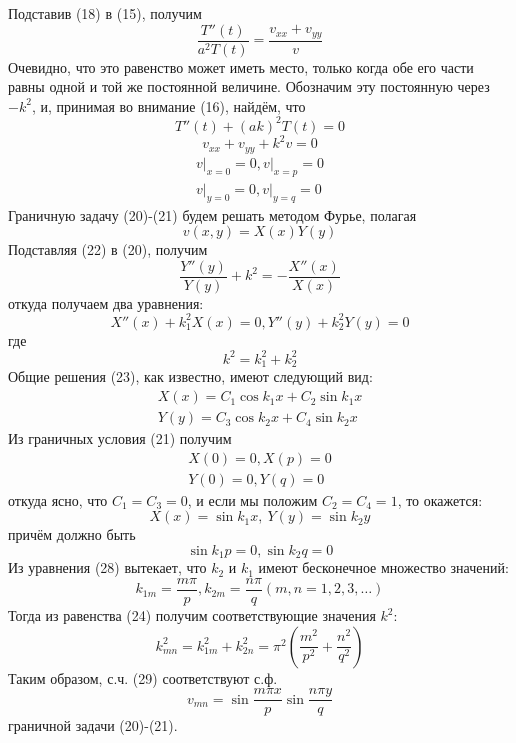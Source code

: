 \begin{enumerate}
Подставив (18) в (15), получим
\[
	\frac{T''(t)}{a^2 T(t)} = \frac{v_{xx} + v_{yy}}{v}
\]
Очевидно, что это равенство может иметь место, только когда обе его части равны одной и той же постоянной величине. Обозначим эту постоянную через $-k^2$, и, принимая во внимание (16), найдём, что
\[
	T''(t) + (ak)^2 T(t) = 0 \tag{19}
\]
\[
	v_{xx} + v_{yy} + k^2 v = 0 \tag{20}
\]
\[
	\begin{aligned}
	\left. v\right|_{x=0} = 0, \left. v\right|_{x=p} = 0 \\
			\left. v\right|_{y=0} = 0, \left. v\right|_{y=q} = 0
				\end{aligned} \tag{21}
\]
Граничную задачу (20)-(21) будем решать методом Фурье, полагая
\[
	v(x,y) = X(x) Y(y) \tag{22}
\]
Подставляя (22) в (20), получим
\[
	\frac{Y''(y)}{Y(y)} + k^2 = -\frac{X''(x)}{X(x)}
\]
откуда получаем два уравнения:
\[
	X''(x) + k_1^2 X(x) = 0, Y''(y) + k_2^2 Y(y) = 0 \tag{23}
\]
где
\[
	k^2 = k_1^2 + k_2^2 \tag{24}
\]
Общие решения (23), как известно, имеют следующий вид:
\[
	\begin{aligned}
		X(x) = C_1 \cos k_1 x + C_2 \sin k_1 x \\
		Y(y) = C_3 \cos k_2 x + C_4 \sin k_2 x
	\end{aligned} \tag{25}
\]
Из граничных условия (21) получим
\[
	\begin{aligned}
		X(0) = 0, X(p) = 0 \\
		Y(0) = 0, Y(q) = 0
	\end{aligned} \tag{26}
\]
откуда ясно, что $C_1 = C_3 = 0$, и если мы положим $C_2 = C_4 = 1$, то окажется:
\[
	X(x) = \sin k_1 x, ~ Y(y) = \sin k_2 y \tag{27}
\]
причём должно быть
\[
	\sin k_1 p = 0, \sin k_2 q = 0 \tag{28}
\]
Из уравнения (28) вытекает, что $k_2$ и $k_1$ имеют бесконечное множество значений:
\[
	k_{1m} = \frac{m\pi}{p}, k_{2m} = \frac{n \pi}{q} (m,n=1,2,3,\dots)
\]
Тогда из равенства (24) получим соответствующие значения $k^2$:
\[
	k_{mn}^2 = k_{1m}^2 + k_{2n}^2 = \pi^2 \left( \frac{m^2}{p^2} + \frac{n^2}{q^2}\right) \tag{29}
\]
Таким образом, с.ч. (29) соответствуют с.ф.
\[
	v_{mn} = \sin \frac{m \pi x}{p} \sin \frac{n \pi y}{q} \tag{30}
\]
граничной задачи (20)-(21).


\end{enumerate}
